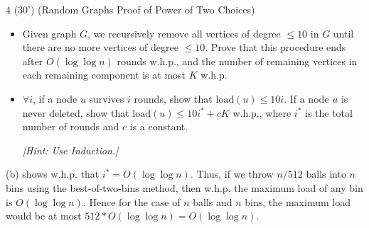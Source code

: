 \begin{question}{4 (30') (Random Graphs Proof of Power of Two Choices)}
\begin{itemize}
        \item [b. (10')] Given graph $G$, we recursively remove all vertices of degree $\le 10$ in $G$ until there are no more vertices of degree $\le 10$. Prove that this procedure ends after $O(\log \log n)$ rounds w.h.p., and the number of remaining vertices in each remaining component is at most $K$ w.h.p.
        
        \item [c. (10')] $\forall i$, if a node $u$ survives $i$ rounds, show that $\mathrm{load}(u)\leq 10 i$. If a node $u$ is never deleted, show that $\mathrm{load}(u)\leq 10i^* + cK$ w.h.p., where $i^*$ is the total number of rounds and $c$ is a constant.
        
        \textit{[Hint: Use Induction.]}
    \end{itemize}

    (b) shows w.h.p. that $i^{*} = O(\log \log n)$. Thus, if we throw $n/512$ balls into $n$ bins using the best-of-two-bins method, then w.h.p. the maximum load of any bin is $O(\log \log n)$. Hence for the case of $n$ balls and $n$ bins, the maximum load would be at most $512*O(\log \log n)=O(\log \log n)$.
    
\end{question}

